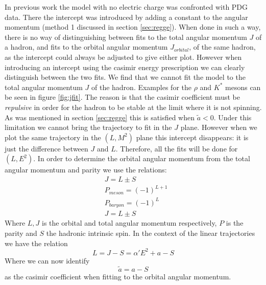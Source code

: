 \documentclass[11pt,a4paper]{article}
\begin{document}
In previous work \cite{Sonnenschein14,Sonnenschein15} the model with no electric charge was confronted with PDG data. There the intercept was introduced by adding a constant to the angular momentum (method 1 discussed in section \ref{sec:regge}). When done in such a way, there is no way of distinguishing between fits to the total angular momentum $J$ of a hadron, and fits to the orbital angular momentum $J_{orbital}$, of the same hadron, as the intercept could always be adjusted to give either plot. However when introducing an intercept using the casimir energy prescription we can clearly distinguish between the two fits. We find that we cannot fit the model to the total angular momentum $J$ of the hadron. Examples for the $\rho$ and $K^{*}$ mesons can be seen in figure \ref{fig:jfit}. The reason is that the casimir coefficient must be \emph{repulsive} in order for the hadron to be stable at the limit where it is not spinning. As was mentioned in section \ref{sec:regge} this is satisfied when $\tilde{a}<0$. Under this limitation we cannot bring the trajectory to fit in the $J$ plane. However when we plot the same trajectory in the $\left(L,M^2\right)$ plane this intercept disappears: it is just the difference between $J$ and $L$. Therefore, all the fits will be done for $\left(L,E^{2}\right)$. In order to determine the orbital angular momentum from the total angular momentum and parity we use the relations:
\begin{align*}
&J=L\pm S\\
&P_{meson}=\left(-1\right)^{L+1}\\
&P_{baryon}=\left(-1\right)^{L}\\
&J=L\pm S
\end{align*}
Where $L,J$ is the orbital and total angular momentum respectively, $P$ is the parity and $S$ the hadronic intrinsic spin. In the context of the linear trajectories we have the relation 
\begin{equation}
L=J-S=\alpha' E^2+a-S
\end{equation}
Where we can now identify
\begin{equation}
\label{eq:atilde}
\tilde{a}=a-S
\end{equation}
as the casimir coefficient when fitting to the orbital angular momentum.
\end{document}
